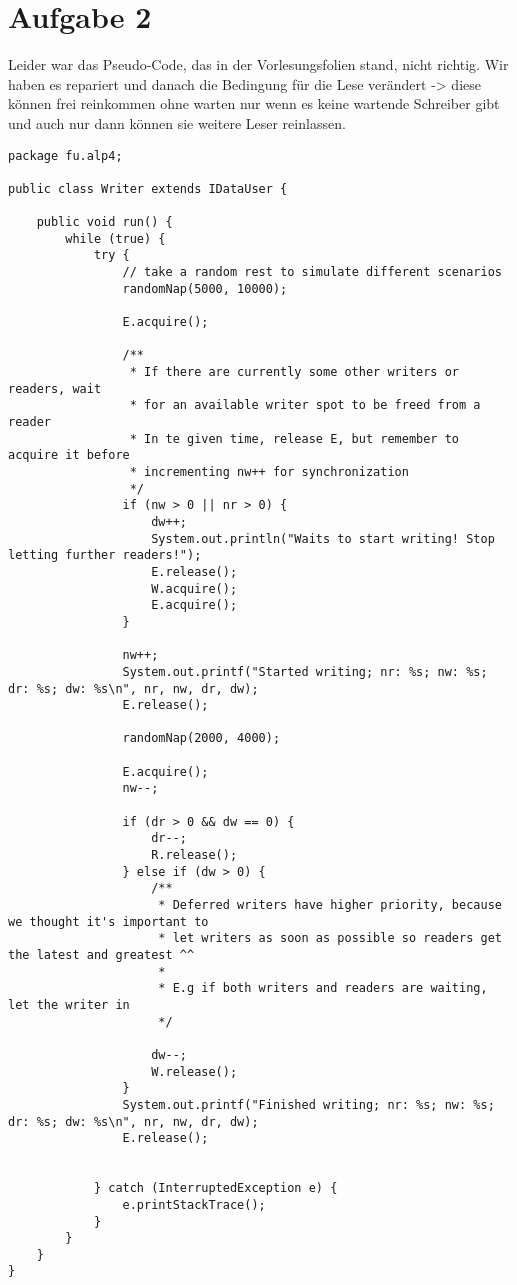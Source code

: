 \section*{Aufgabe 2}

Leider war das Pseudo-Code, das in der Vorlesungsfolien stand, nicht richtig. Wir haben es repariert und danach die Bedingung für die Lese verändert -> diese können frei reinkommen ohne warten nur wenn es keine wartende Schreiber gibt und auch nur dann können sie weitere Leser reinlassen.

\begin{lstlisting}[style=java]
package fu.alp4;

public class Writer extends IDataUser {

    public void run() {
        while (true) {
            try {
                // take a random rest to simulate different scenarios
                randomNap(5000, 10000);

                E.acquire();

                /**
                 * If there are currently some other writers or readers, wait
                 * for an available writer spot to be freed from a reader
                 * In te given time, release E, but remember to acquire it before
                 * incrementing nw++ for synchronization
                 */
                if (nw > 0 || nr > 0) {
                    dw++;
                    System.out.println("Waits to start writing! Stop letting further readers!");
                    E.release();
                    W.acquire();
                    E.acquire();
                }

                nw++;
                System.out.printf("Started writing; nr: %s; nw: %s; dr: %s; dw: %s\n", nr, nw, dr, dw);
                E.release();

                randomNap(2000, 4000);

                E.acquire();
                nw--;

                if (dr > 0 && dw == 0) {
                    dr--;
                    R.release();
                } else if (dw > 0) {
                    /**
                     * Deferred writers have higher priority, because we thought it's important to
                     * let writers as soon as possible so readers get the latest and greatest ^^
                     *
                     * E.g if both writers and readers are waiting, let the writer in
                     */

                    dw--;
                    W.release();
                }
                System.out.printf("Finished writing; nr: %s; nw: %s; dr: %s; dw: %s\n", nr, nw, dr, dw);
                E.release();


            } catch (InterruptedException e) {
                e.printStackTrace();
            }
        }
    }
}

\end{lstlisting}

